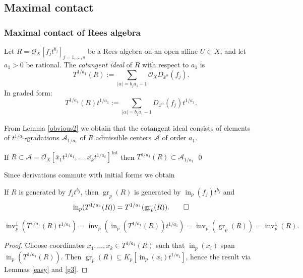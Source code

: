 \documentclass{amsart}
\newcommand{\cA}{{\mathcal A}}
\newcommand{\cO}{{\mathcal O}}
\newcommand{\Int}{{\operatorname{Int}}}
\newcommand{\inn}{\operatorname{in}}
\newcommand{\gr}{{\operatorname{gr}}}
\newcommand{\inv}{{\operatorname{inv}}}
\begin{document}

\subsection{Maximal contact}

\subsubsection{Maximal contact of Rees algebra} \label{maxims}

\begin{definition}\label{cota}
Let $R = \cO_X[f_j t^{b_j}]_{j=1,\ldots,s}$ be a Rees algebra on an open affine $U \subset X$, and let $a_1 > 0$ be rational. The \emph{cotangent ideal} of $R$ with respect to $a_1$ is
\[
T^{1/a_1}(R) := \sum_{|\alpha| = b_j a_1 - 1} \cO_X D_{\overline{x}^\alpha}(f_j).
\]
In graded form:
\[
T^{1/a_1}(R)t^{1/a_1} := \sum_{|\alpha| = b_j a_1 - 1} D_{\overline{x}^\alpha}(f_j) t^{1/a_1}.
\]
\end{definition}
From Lemma \ref{obvious2} we obtain that the cotangent ideal consists of  elements of  $t^{1/a_1}$-gradations $\cA_{1/a_1}$ of  $R$ admissible centers $\cA$ of order $a_1$.
\begin{lemma}  \label{easy} If $R\subset \cA=\cO_X[\overline{x}_1t^{1/a_1},\ldots,\overline{x_k}t^{1/a_k}]^{\Int}$ then $T^{1/a_1}(R)\subset \cA_{1/a_1}$
\qed
\end{lemma}

Since  derivations commute with initial forms we obtain

\begin{lemma}
If $R$ is generated by $f_j t^{b_j}$, then $\gr_p(R)$ is generated by $\inn_p(f_j)t^{b_j}$ and
\[
\inn_p(T^{1/a_1}(R)) = T^{1/a_1}(\gr_p(R)). \qed
\]
\end{lemma}
\begin{lemma}
\[
\inv_p^1(T^{1/a_1}(R)t^{1/a_1}) = \inv_p(\inn_p(T^{1/a_1}(R))t^{1/a_1}) = \inv_p(\gr_p(R)) = \inv_p^1(R).
\]
\end{lemma}
\begin{proof}
Choose coordinates $x_1, \ldots, x_k \in T^{1/a_1}(R)$ such that $\inn_p(x_i)$ span $\inn_p(T^{1/a_1}(R))$. Then $\gr_p(R)\subseteq K_p[\inn_p(x_i)t^{1/a_1}]$, hence the result via Lemmas \ref{easy} and  \ref{g3}.
\end{proof}
\end{document}
